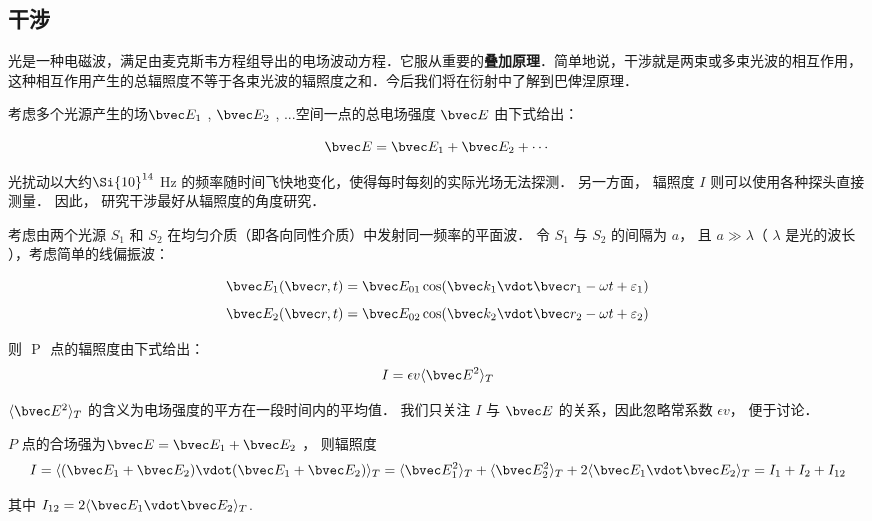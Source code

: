 
\subsection{干涉}

光是一种电磁波，满足由麦克斯韦方程组导出的电场波动方程．它服从重要的\textbf{叠加原理}．简单地说，干涉就是两束或多束光波的相互作用，这种相互作用产生的总辐照度不等于各束光波的辐照度之和．今后我们将在衍射中了解到巴俾涅原理．

考虑多个光源产生的场$\bvec E_1$ , $\bvec E_2$ , ...空间一点的总电场强度 $\bvec E$ 由下式给出：

$$ \bvec E = \bvec E_1 + \bvec E_2 + \cdots$$

光扰动以大约$\Si{10}^{14}$ Hz 的频率随时间飞快地变化，使得每时每刻的实际光场无法探测． 另一方面， 辐照度 $I$ 则可以使用各种探头直接测量． 因此， 研究干涉最好从辐照度的角度研究．

考虑由两个光源 $S_1$ 和 $S_2$ 在均匀介质（即各向同性介质）中发射同一频率的平面波． 令 $S_1$ 与 $S_2$ 的间隔为 $a$， 且 $ a \gg \lambda $（ $\lambda$ 是光的波长 ），考虑简单的线偏振波：

$$ \bvec E_1 ( \bvec r , t) = \bvec E_{01} \cos (\bvec k_1 \vdot \bvec r_1 - \omega t + \varepsilon_1 )$$
$$ \bvec E_2 ( \bvec r , t) = \bvec E_{02} \cos (\bvec k_2 \vdot \bvec r_2 - \omega t + \varepsilon_2 )$$

则 $ $ P $ $ 点的辐照度由下式给出：
\begin{equation}
 I = \epsilon v \langle \bvec E^2 \rangle _T 
\end{equation}

$\langle \bvec E^2 \rangle _T$ 的含义为电场强度的平方在一段时间内的平均值． 我们只关注 $ I $ 与 $ \bvec E $ 的关系，因此忽略常系数 $ \epsilon v$， 便于讨论． 

 $ P $ 点的合场强为$ \bvec E = \bvec E_1 + \bvec E_2 $ ， 则辐照度  
\begin{equation}
I = \langle( \bvec E_1 + \bvec E_2)\vdot( \bvec E_1 + \bvec E_2 )\rangle _T \\
 = \langle \bvec E_1^2 \rangle _T + \langle \bvec E_2^2 \rangle _T + 2\langle \bvec E_1 \vdot \bvec E_2 \rangle _T = I_1 + I_2 + I_{12}
\end{equation}

其中 $ I _{12} =2 \langle \bvec E_1 \vdot \bvec E_2 \rangle _T$.

